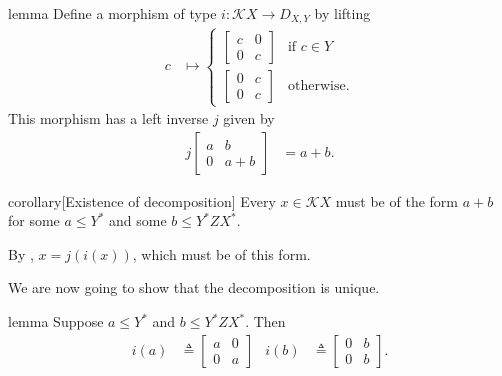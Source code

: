 \documentclass[a4paper,UKenglish,cleveref, autoref, thm-restate]{lipics-v2021}
\begin{document}
\begin{theoremEnd}{lemma}
  \label{lem:decomposition}
  Define a morphism of type $i : \mathcal{K}X  \to  D_{X,Y}$ by lifting
  \begin{align*}
    c &  \mapsto  \begin{cases}
            \begin{bmatrix}
              c & 0 \\
              0 & c
            \end{bmatrix}
            & \text{if $c  \in  Y$} \\
            \begin{bmatrix}
              0 & c \\
              0 & c
            \end{bmatrix} &
            \text{otherwise}.
          \end{cases}
  \end{align*}
  This morphism has a left inverse $j$ given by
  \begin{align*}
    j
    \begin{bmatrix}
      a & b \\
      0 & a + b
    \end{bmatrix}
    & = a + b.
  \end{align*}
\end{theoremEnd}

\begin{theoremEnd}{corollary}[Existence of decomposition]
  Every $x  \in  \mathcal{K}X$ must be of the form $a + b$ for some $a  \leq  Y^*$ and some
  $b  \leq  Y^*ZX^*$.
\end{theoremEnd}

\begin{proofEnd}
  By , $x = j(i(x))$, which must be of this form.
\end{proofEnd}

We are now going to show that the decomposition is unique.

\begin{theoremEnd}{lemma}
  \label{lem:decomposition-orthogonal}
  Suppose $a  \leq  Y^*$ and $b  \leq  Y^*ZX^*$. Then
  \begin{align*}
    i(a)
    &  \triangleq 
      \begin{bmatrix}
        a & 0 \\
        0 & a
      \end{bmatrix} &
    i(b)
    &  \triangleq 
      \begin{bmatrix}
        0 & b \\
        0 & b
      \end{bmatrix}.
  \end{align*}
\end{theoremEnd}
\end{document}
